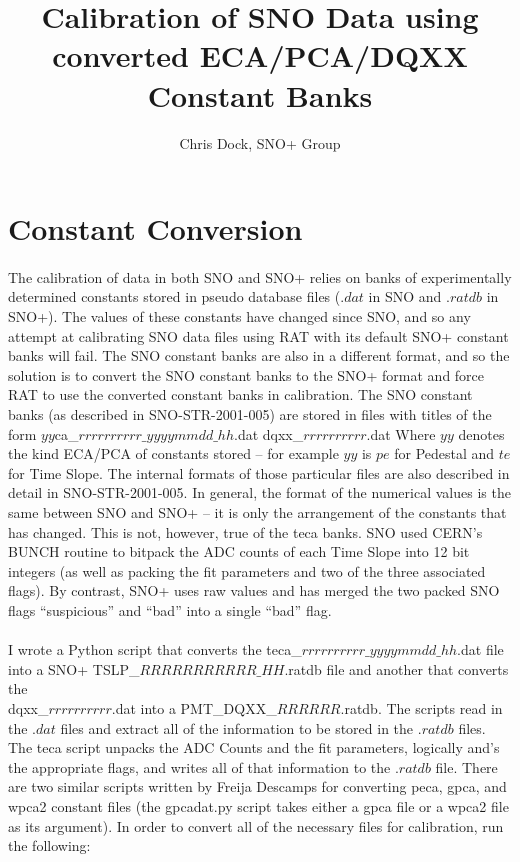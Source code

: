 \documentclass[12pt,letterpaper]{article}
\title{Calibration of SNO Data using converted ECA/PCA/DQXX Constant Banks}
\author{Chris Dock, SNO+ Group}
\begin{document}
\maketitle
\section{Constant Conversion}
\paragraph{}The calibration of data in both SNO and SNO+ relies on banks of experimentally determined constants stored in pseudo database files ($.dat$ in SNO and $.ratdb$ in SNO+). The values of these constants have changed since SNO, and so any attempt at calibrating SNO data files using RAT with its default SNO+ constant banks will fail. The SNO constant banks are also in a different format, and so the solution is to convert the SNO constant banks to the SNO+ format and force RAT to use the converted constant banks in calibration. The SNO constant banks (as described in SNO-STR-2001-005) are stored in files with titles of the form
\newline
\newline
$yy$ca\_$rrrrrrrrrr\_yyyymmdd\_hh$.dat
\newline
dqxx\_$rrrrrrrrrr$.dat
\newline
\newline
Where $yy$ denotes the kind ECA/PCA of constants stored -- for example $yy$ is $pe$ for Pedestal and $te$ for Time Slope. The internal formats of those particular files are also described in detail in SNO-STR-2001-005. In general, the format of the numerical values is the same between SNO and SNO+ -- it is only the arrangement of the constants that has changed. This is not, however, true of the teca banks. SNO used CERN's BUNCH routine to bitpack the ADC counts of each Time Slope into 12 bit integers (as well as packing the fit parameters and two of the three associated flags). By contrast, SNO+ uses raw values and has merged the two packed SNO flags ``suspicious'' and ``bad'' into a single ``bad'' flag. 

\paragraph{} I wrote a Python script that converts the teca\_$rrrrrrrrrr\_yyyymmdd\_hh$.dat file into a SNO+ TSLP\_$RRRRRRRRRRR\_HH$.ratdb file and another that converts the \\dqxx\_$rrrrrrrrrr$.dat into a PMT\_DQXX\_$RRRRRR$.ratdb. The scripts read in the $.dat$ files and extract all of the information to be stored in the $.ratdb$ files. The teca script unpacks the ADC Counts and the fit parameters, logically and's the appropriate flags, and writes all of that information to the $.ratdb$ file. There are two similar scripts written by Freija Descamps for converting peca, gpca, and wpca2 constant files (the gpcadat.py script takes either a gpca file or a wpca2 file as its argument). In order to convert all of the necessary files for calibration, run the following:
\end{document}
